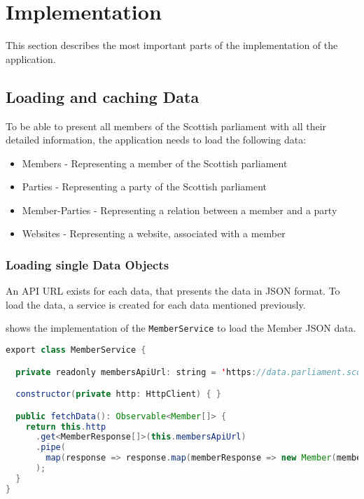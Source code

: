 \section{Implementation}\label{sec:02_impl}
This section describes the most important parts of the implementation of the application.

\subsection{Loading and caching Data}\label{subsec:02_impl_data}
To be able to present all members of the Scottish parliament with all their detailed information, the application needs to load the following data:
\begin{itemize}
\item Members - Representing a member of the Scottish parliament
\item Parties - Representing a party of the Scottish parliament
\item Member-Parties - Representing a relation between a member and a party
\item Websites - Representing a website, associated with a member
\end{itemize}


\subsubsection{Loading single Data Objects}\label{subsubsec:02_impl_data_loading}
An API URL exists for each data, that presents the data in JSON format. To load the data, a service is created for each data mentioned previously.

 shows the implementation of the \texttt{MemberService} to load the Member JSON data.
\begin{lstlisting}[label=lst:02_impl_data_memberservice, caption=\texttt{MemberService} implementation, language=java]
export class MemberService {

  private readonly membersApiUrl: string = 'https://data.parliament.scot/api/members';

  constructor(private http: HttpClient) { }

  public fetchData(): Observable<Member[]> {
    return this.http
      .get<MemberResponse[]>(this.membersApiUrl)
      .pipe(
        map(response => response.map(memberResponse => new Member(memberResponse)))
      );
  }
}
\end{lstlisting}

